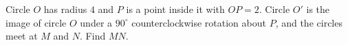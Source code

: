 Circle $O$ has radius $4$ and $P$ is a point inside it with $OP=2$. Circle $O'$ is the image of circle $O$ under a $90^\circ$ counterclockwise rotation about $P$, and the circles meet at $M$ and $N$. Find $MN$.

